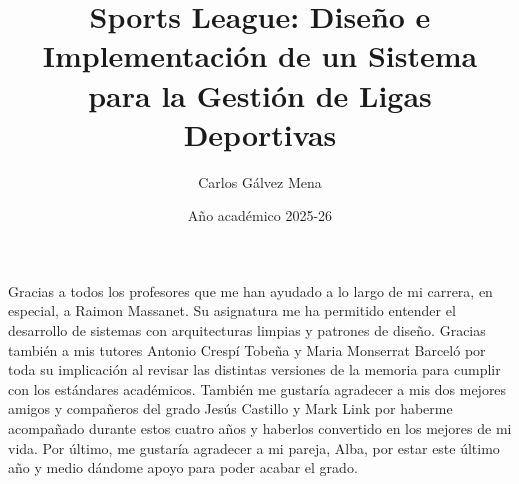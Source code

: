 \documentclass[spanish, GINF]{TFGEPSUIB}
\title{Sports League: Diseño e Implementación de un Sistema para la Gestión de Ligas Deportivas}
\author{Carlos Gálvez Mena}
\date{Año académico 2025-26}
\begin{document}
\portada
\portadainterior
\frontmatter

%
\cleartorecto \thispagestyle{empty}
\begin{agraiments}
Gracias a todos los profesores que me han ayudado a lo largo de mi carrera, en especial, a Raimon Massanet. Su asignatura me ha permitido entender el desarrollo de sistemas con arquitecturas limpias y patrones de diseño. Gracias también a mis tutores Antonio Crespí Tobeña y Maria Monserrat Barceló por toda su implicación al revisar las distintas versiones de la memoria para cumplir con los estándares académicos. También me gustaría agradecer a mis dos mejores amigos y compañeros del grado Jesús Castillo y Mark Link por haberme acompañado durante estos cuatro años y haberlos convertido en los mejores de mi vida. Por último, me gustaría agradecer a mi pareja, Alba, por estar este último año y medio dándome apoyo para poder acabar el grado.
\end{agraiments}

\cleartorecto \tableofcontents

\cleartorecto \listoffigures
\cleartorecto \listoftables

 

 

\mainmatter\pagestyle{ruled}










\end{document}
